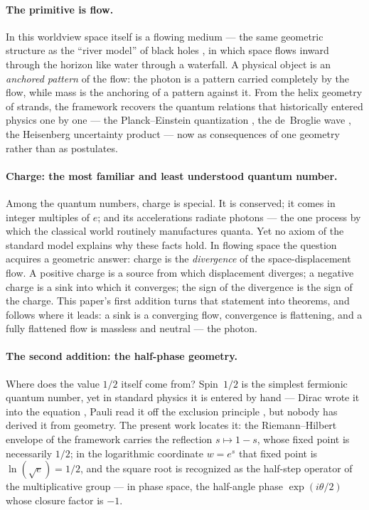 \documentclass[aps,prd,preprint,superscriptaddress,amsmath,amssymb]{revtex4-2}
\begin{document}
\paragraph{The primitive is flow.}
In this worldview space itself is a flowing medium --- the same
geometric structure as the ``river model'' of black holes
\cite{hamilton2008river}, in which space flows inward through the
horizon like water through a waterfall.  A physical object is an
\emph{anchored pattern} of the flow: the photon is a pattern carried
completely by the flow, while mass is the anchoring of a pattern
against it.  From the helix geometry of strands, the framework recovers
the quantum relations that historically entered physics one by one ---
the Planck--Einstein quantization \cite{planck1978gesetz}, the de~Broglie
wave \cite{de1924recherches}, the Heisenberg uncertainty product
\cite{heisenberg1927anschaulichen} --- now as consequences of one
geometry rather than as postulates.

\paragraph{Charge: the most familiar and least understood quantum number.}
Among the quantum numbers, charge is special.  It is conserved; it comes
in integer multiples of $e$; and its accelerations radiate photons ---
the one process by which the classical world routinely manufactures
quanta.  Yet no axiom of the standard model explains why these facts
hold.  In flowing space the question acquires a geometric answer:
charge is the \emph{divergence} of the space-displacement flow.  A
positive charge is a source from which displacement diverges; a negative
charge is a sink into which it converges; the sign of the divergence is
the sign of the charge.  This paper's first addition turns that
statement into theorems, and follows where it leads: a sink is a
converging flow, convergence is flattening, and a fully flattened
flow is massless and neutral --- the photon.

\paragraph{The second addition: the half-phase geometry.}
Where does the value $1/2$ itself come from?  Spin~$1/2$ is the
simplest fermionic quantum number, yet in standard physics it is
entered by hand --- Dirac wrote it into the equation
\cite{dirac1928quantum}, Pauli read it off the exclusion principle
\cite{pauli1925zusammenhang}, but nobody has derived it from geometry.
The present work locates it: the Riemann--Hilbert envelope of the
framework \cite{RiemannHIBS} carries the reflection $s\mapsto 1-s$,
whose fixed point is necessarily $1/2$; in the logarithmic coordinate
$w=e^s$ that fixed point is $\ln(\sqrt e)=1/2$, and the square root is
recognized as the half-step operator of the multiplicative group ---
in phase space, the half-angle phase $\exp(i\theta/2)$ whose closure
factor is $-1$.
\end{document}
